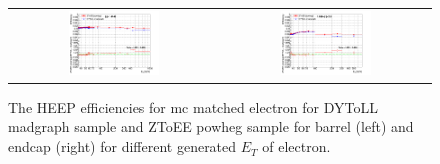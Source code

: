 \begin{figure}[bh]
  \begin{center}
    \begin{tabular}{cc}
      \includegraphics[width=0.45\textwidth]{figures/Zprime/2016/ScaleFactor/SameSign/ZToEE_DYToLL_mad/compare_divide_Et_barrel_pass_by_Et_barrel_all.png} &
      \includegraphics[width=0.45\textwidth]{figures/Zprime/2016/ScaleFactor/SameSign/ZToEE_DYToLL_mad/compare_divide_Et_endcap_pass_by_Et_endcap_all.png} \\
    \end{tabular}
    \caption{The HEEP efficiencies for mc matched electron for DYToLL madgraph sample and ZToEE powheg sample for barrel (left) and endcap (right) for different generated $E_T$ of electron.}
    \label{fig:eff_ZToEE_DYToLL_mad_ET}
  \end{center}
\end{figure}

